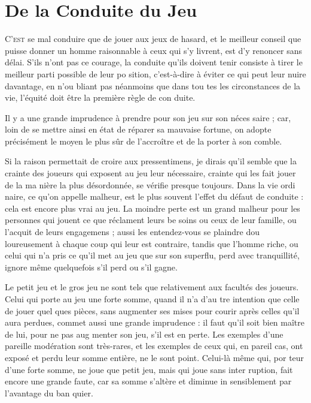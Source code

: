 \chapter{De la Conduite du Jeu}

\lettrine{C}{'est} se mal conduire que de jouer
aux jeux de hasard, et le meilleur
conseil que puisse donner un homme
raisonnable à ceux qui s'y livrent,
est d'y renoncer sans délai. S'ils
n'ont pas ce courage, la conduite
qu'ils doivent tenir consiste à tirer
le meilleur parti possible de leur po%
sition, c'est-à-dire à éviter ce qui
peut leur nuire davantage, en n'ou%
bliant pas néanmoins que dans tou%
tes les circonstances de la vie, l'équité
doit être la première règle de con%
duite.

Il y a une grande imprudence à
prendre pour son jeu sur son néces%
saire ; car, loin de se mettre ainsi en
état de réparer sa mauvaise fortune,
on adopte précisément le moyen le
plus sûr de l'accroître et de la porter
à son comble.

Si la raison permettait de croire
aux pressentimens, je dirais qu'il
semble que la crainte des joueurs
qui exposent au jeu leur nécessaire,
crainte qui les fait jouer de la ma%
nière la plus désordonnée, se vérifie
presque toujours. Dans la vie ordi%
naire, ce qu'on appelle malheur, est
le plus souvent l'effet du défaut de
conduite : cela est encore plus vrai
au jeu. La moindre perte est un grand
malheur pour les personnes qui
jouent ce que réclament leurs be%
soins ou ceux de leur famille, ou
l'acquit de leurs engagemens ; aussi
les entendez-vous se plaindre dou%
loureusement à chaque coup qui leur
est contraire, tandis que l'homme
riche, ou celui qui n'a pris ce qu'il
met au jeu que sur son superflu,
perd avec tranquillité, ignore même
quelquefois s'il perd ou s'il gagne.

Le petit jeu et le gros jeu ne sont
tels que relativement aux facultés
des joueurs. Celui qui porte au jeu
une forte somme, quand il n'a d'au%
tre intention que celle de jouer quel%
ques pièces, sans augmenter ses
mises pour courir après celles qu'il
aura perdues, commet aussi une
grande imprudence : il faut qu'il soit
bien maître de lui, pour ne pas aug%
menter son jeu, s'il est en perte. Les
exemples d'une pareille modération
sont très-rares, et les exemples de
ceux qui, en pareil cas, ont exposé
et perdu leur somme entière, ne le
sont point. Celui-là même qui, por%
teur d'une forte somme, ne joue que
petit jeu, mais qui joue sans inter%
ruption, fait encore une grande faute,
car sa somme s'altère et diminue in%
sensiblement par l'avantage du ban%
quier.

